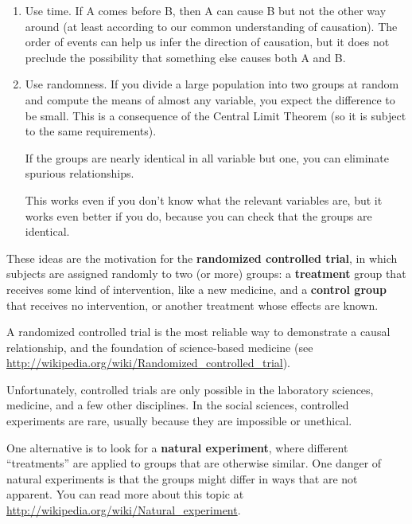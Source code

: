 \documentclass[12pt]{book}
\begin{document}
\begin{enumerate}

\item Use time.  If A comes before B, then A can cause B but not the
  other way around (at least according to our common understanding of
  causation).  The order of events can help us infer the direction
  of causation, but it does not preclude the possibility that something
  else causes both A and B.

\item Use randomness.  If you divide a large population into two
  groups at random and compute the means of almost any variable, you
  expect the difference to be small.  This is a consequence of the
  Central Limit Theorem (so it is subject to the same requirements).

  If the groups are nearly identical in all variable but one, you
  can eliminate spurious relationships.

  This works even if you don't know what the relevant variables
  are, but it works even better if you do, because you can check that
  the groups are identical.

\end{enumerate}

These ideas are the motivation for the {\bf randomized controlled
trial}, in which subjects are assigned randomly to two (or more)
groups: a {\bf treatment} group that receives some kind of intervention,
like a new medicine, and a {\bf control group} that receives
no intervention, or another treatment whose effects are known.

A randomized controlled trial is the most reliable way to demonstrate
a causal relationship, and the foundation of science-based medicine
(see \url{http://wikipedia.org/wiki/Randomized_controlled_trial}).

Unfortunately, controlled trials are only possible in the laboratory
sciences, medicine, and a few other disciplines.  In the social sciences,
controlled experiments are rare, usually because they are impossible
or unethical.

One alternative is to look for a {\bf natural experiment}, where
different ``treatments'' are applied to groups that are otherwise
similar.  One danger of natural experiments is that the groups might
differ in ways that are not apparent.  You can read more about this
topic at \url{http://wikipedia.org/wiki/Natural_experiment}.
\end{document}

